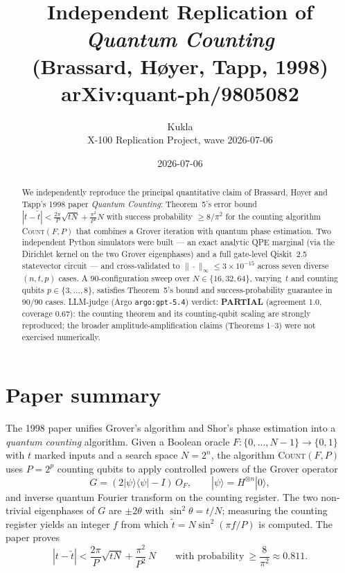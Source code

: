 \documentclass[11pt]{article}
\title{Independent Replication of \emph{Quantum Counting}\\
       (Brassard, H\o{}yer, Tapp, 1998)\\
       arXiv:quant-ph/9805082}
\author{Kukla \\ X-100 Replication Project, wave 2026-07-06}
\date{2026-07-06}
\begin{document}
\maketitle

\begin{abstract}
We independently reproduce the principal quantitative claim of Brassard,
H\o{}yer and Tapp's 1998 paper \emph{Quantum Counting}: Theorem~5's error bound
$|t-\tilde t| < \tfrac{2\pi}{P}\sqrt{tN} + \tfrac{\pi^2}{P^2}N$ with success
probability $\ge 8/\pi^2$ for the counting algorithm \textsc{Count}$(F,P)$ that
combines a Grover iteration with quantum phase estimation. Two independent
Python simulators were built --- an exact analytic QPE marginal (via the
Dirichlet kernel on the two Grover eigenphases) and a full gate-level Qiskit~2.5
statevector circuit --- and cross-validated to $\|\cdot\|_\infty \le 3\!\times\!10^{-15}$
across seven diverse $(n,t,p)$ cases. A 90-configuration sweep over
$N\in\{16,32,64\}$, varying~$t$ and counting qubits $p\in\{3,\dots,8\}$, satisfies
Theorem~5's bound and success-probability guarantee in $90/90$ cases. LLM-judge
(Argo \texttt{argo:gpt-5.4}) verdict: \textbf{PARTIAL} (agreement 1.0,
coverage 0.67): the counting theorem and its counting-qubit scaling are
strongly reproduced; the broader amplitude-amplification claims (Theorems 1--3)
were not exercised numerically.
\end{abstract}

\section{Paper summary}
The 1998 paper unifies Grover's algorithm and Shor's phase estimation into a
\emph{quantum counting} algorithm. Given a Boolean oracle
$F:\{0,\ldots,N-1\}\to\{0,1\}$ with $t$ marked inputs and a search space
$N=2^n$, the algorithm \textsc{Count}$(F,P)$ uses $P=2^p$ counting qubits to
apply controlled powers of the Grover operator
\begin{equation}
G = (2|\psi\rangle\langle\psi| - I)\,O_F, \qquad
|\psi\rangle = H^{\otimes n}|0\rangle,
\end{equation}
and inverse quantum Fourier transform on the counting register. The two
non-trivial eigenphases of $G$ are $\pm 2\theta$ with
$\sin^2\theta = t/N$; measuring the counting register yields an integer $f$ from
which $\tilde t = N\sin^2(\pi f / P)$ is computed. The paper proves
\begin{equation}
|t - \tilde t| < \frac{2\pi}{P}\sqrt{tN} + \frac{\pi^2}{P^2}\,N
\qquad\text{with probability}\ \ge \frac{8}{\pi^2}\approx 0.811.
\label{eq:thm5}
\end{equation}
\end{document}
